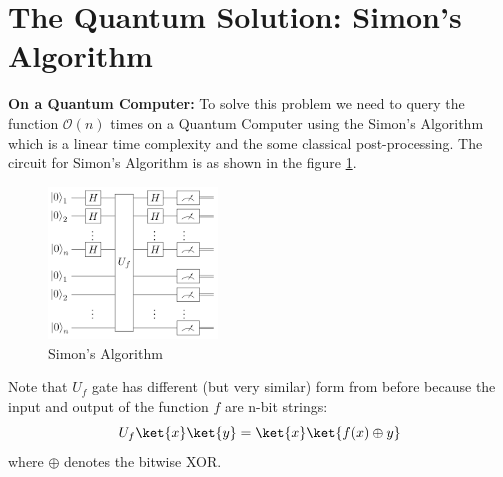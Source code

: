 \documentclass[12pt, oneside]{book}
\theoremstyle{definition}
\theoremstyle{definition}
\theoremstyle{remark}
\begin{document}
\section{The Quantum Solution: Simon's Algorithm}
\textbf{On a Quantum Computer: }To solve this problem we need to query the function $\mathcal{O}(n)$ times on a Quantum Computer using the Simon's Algorithm which is a linear time complexity and the some classical post-processing.
The circuit for Simon's Algorithm is as shown in the figure \ref{fig:simon}.
\begin{figure}[H]
    \centering
    \includegraphics[width=0.4\textwidth]{../images/Simon.png}
    \caption{Simon's Algorithm}
    \label{fig:simon}
\end{figure}
Note that $U_f$ gate has  different (but very similar) form from before because the input and output of the function $f$ are n-bit strings:
\[
U_f\ket{x}\ket{y}=\ket{x}\ket{f(x) \oplus y}
\]
where $\oplus$ denotes the bitwise XOR.
\end{document}
